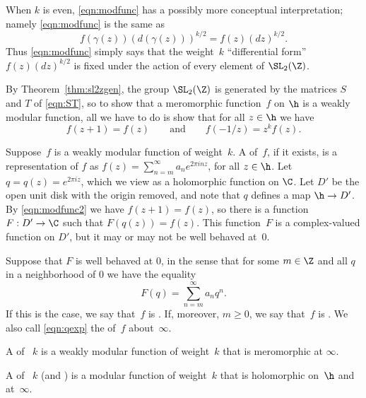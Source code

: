 When $k$ is even, \eqref{eqn:modfunc} has a possibly 
more conceptual interpretation; namely
 \eqref{eqn:modfunc} is the same as
$$
  f(\gamma(z))(d(\gamma(z)))^{k/2} = f(z)(dz)^{k/2}.
$$
Thus \eqref{eqn:modfunc} simply says that 
the weight~$k$ ``differential form'' $f(z)(dz)^{k/2}$
is fixed under the action of every element of
$\SL_2(\Z)$.  


By Theorem~\ref{thm:sl2zgen}, the group $\SL_2(\Z)$ is generated by
the matrices $S$ and $T$ of \eqref{eqn:ST}, so to show that a
meromorphic function~$f$ on $\h$ is a weakly modular function, 
all we have to do is show that for all $z\in\h$ we have
\begin{equation}\label{eqn:modfunc2}
  f(z+1) = f(z) \qquad\text{and}\qquad f(-1/z) = z^k f(z).
\end{equation}

Suppose~$f$ is a weakly modular function of weight~$k$.  A
 of~$f$, if it exists, is a representation of
$f$ as $f(z) = \sum_{n=m}^{\infty} a_n e^{2\pi i nz}$, for all $z\in
\h$.  Let $q=q(z)=e^{2\pi i z}$, which we view as a holomorphic
function on $\C$.  Let $D'$ be the open unit disk with the origin
removed, and note that $q$ defines a map $\h \to D'$.  By \eqref{eqn:modfunc2} we have $f(z+1)=f(z)$, so there is a
function $F:D'\to \C$ such that $F(q(z)) = f(z)$.  This
function~$F$ is a complex-valued function on $D'$, but
it may or may not be well behaved at~$0$.


Suppose that $F$ is well behaved at $0$, in the sense that for some
$m\in\Z$ and all $q$ in a neighborhood of $0$ we have the equality
\begin{equation}\label{eqn:qexp}
 F(q) = \sum_{n=m}^{\infty} a_n q^n.
\end{equation}
If this is the case, we say that~$f$ is 
.  If, moreover,
$m\geq 0$, we say 
that~$f$ is .   We also
call \eqref{eqn:qexp} the  of~$f$ about~$\infty$.
 


\begin{definition}
A  of ~$k$ is a weakly modular function
of weight~$k$ that is meromorphic at $\infty$.
\end{definition}

\begin{definition}
  A  of ~$k$ (and ) is a modular
  function of weight~$k$ that is holomorphic on~$\h$ and at~$\infty$.
\end{definition}

